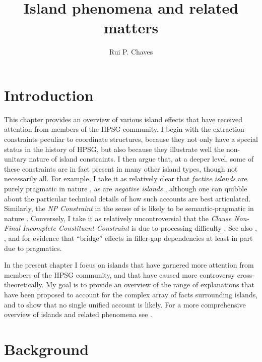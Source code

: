 \documentclass[output=paper
 	        ,biblatex
                ,babelshorthands
                ,newtxmath
                ,draftmode
                ,colorlinks, citecolor=brown
]{langscibook}
\author{Rui P. Chaves\affiliation{University at Buffalo, SUNY}}
\title{Island phenomena and related matters}
\begin{document}
\maketitle
\label{chap-islands}



\section{Introduction} 

This chapter provides an overview of various island effects that have received attention from
members of the HPSG community. I begin with the extraction constraints peculiar to coordinate
structures, because they not only have a special status in the history of HPSG, but also because
they illustrate well the non-unitary nature of island constraints. I then argue that, at a deeper
level, some of these constraints are in fact present in many other island types, though not
necessarily all.  For example, I take it as relatively clear that \emph{factive islands} are purely
pragmatic in nature \citep{Oshima:2006:FIP:1761528.1761544}, as are \emph{negative islands}
\citep{Kroch98a,sza,abrusan,foxneg,abrusanspec}, although one can quibble about the particular
technical details of how such accounts are best articulated.  Similarly, the \emph{NP Constraint} in
the sense of \citet{horn72} is likely to be semantic-pragmatic in nature
\citep{kuno87,godard92f,dubinsky2009,SS2013b-u,chavesking2020}.  Conversely, I take it as relatively
uncontroversial that the \emph{Clause Non-Final Incomplete Constituent Constraint} is due to
processing difficulty \citep{lev91,fodor92}. See also \citet{kothari}, \citet{ambridge:2008}, and
\citet{richterchaves20} for evidence that ``bridge'' effects in filler-gap dependencies at least in
part due to pragmatics.

In the present chapter I focus on islands that have garnered more attention from members of the HPSG
community, and that have caused more controversy cross-theoretically. My goal is to provide an
overview of the range of explanations that have been proposed to account for the complex array of
facts surrounding islands, and to show that no single unified account is likely.
For a more comprehensive overview of islands and related phenomena see \citet[Chapter~3]{CP2020a-u}.



\section{Background}
\end{document}
